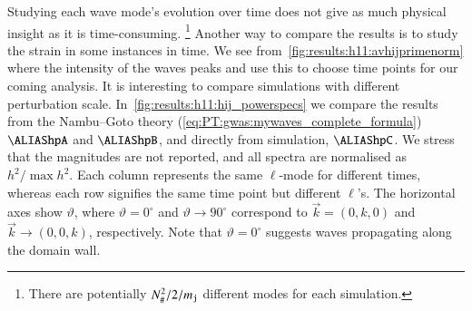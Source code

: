 

    Studying each wave mode's evolution over time does not give as much physical insight as it is time-consuming. \footnote{There are potentially $N_\#^2/2 / m_{\mathtt{j}}$ different modes for each simulation.} %
    Another way to compare the results is to study the strain in some instances in time. 
    We see from~\cref{fig:results:h11:avhijprimenorm} where the intensity of the waves peaks and use this to choose time points for our coming analysis. It is interesting to compare simulations with different perturbation scale. %
    In~\cref{fig:results:h11:hij_powerspecs} we compare the results from the Nambu--Goto theory (\cref{eq:PT:gwas:mywaves_complete_formula}) $\hpA$ and $\hpB$, %
    and directly from simulation, $\hpC$. %
    We stress that the magnitudes are not reported, and all spectra are normalised as $h^2/\max{h^2}$. Each column represents the same $\ell$-mode for different times, whereas each row signifies the same time point but different $\ell$'s. The horizontal axes show $\vartheta$, where $\vartheta=0^\circ$ and $\vartheta \to 90^\circ$ correspond to $\vec{k} =(0,k,0)$ and $\vec{k} \to (0,0,k)$, respectively. Note that $\vartheta=0^\circ$ suggests waves propagating along the domain wall.

